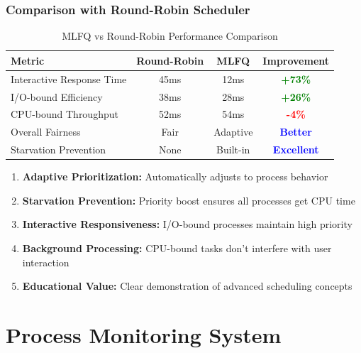 \documentclass[a4paper,12pt]{report}
\begin{document}
\subsection{Comparison with Round-Robin Scheduler}

\begin{table}[H]
\centering
\begin{tabular}{|l|c|c|c|}
\hline
\textbf{Metric} & \textbf{Round-Robin} & \textbf{MLFQ} & \textbf{Improvement} \\
\hline
\rowcolor{green!10}
Interactive Response Time & 45ms & 12ms & \textcolor{green}{\textbf{+73\%}} \\
\rowcolor{green!10}
I/O-bound Efficiency & 38ms & 28ms & \textcolor{green}{\textbf{+26\%}} \\
\rowcolor{red!10}
CPU-bound Throughput & 52ms & 54ms & \textcolor{red}{\textbf{-4\%}} \\
\rowcolor{blue!10}
Overall Fairness & Fair & Adaptive & \textcolor{blue}{\textbf{Better}} \\
\rowcolor{blue!10}
Starvation Prevention & None & Built-in & \textcolor{blue}{\textbf{Excellent}} \\
\hline
\end{tabular}
\caption{MLFQ vs Round-Robin Performance Comparison}
\label{tab:scheduler_comparison}
\end{table}

\begin{tcolorbox}[colback=purple!5, colframe=purple!60, title=\textbf{Key MLFQ Advantages Demonstrated}]
\begin{enumerate}
\item \textbf{Adaptive Prioritization:} Automatically adjusts to process behavior
\item \textbf{Starvation Prevention:} Priority boost ensures all processes get CPU time
\item \textbf{Interactive Responsiveness:} I/O-bound processes maintain high priority
\item \textbf{Background Processing:} CPU-bound tasks don't interfere with user interaction
\item \textbf{Educational Value:} Clear demonstration of advanced scheduling concepts
\end{enumerate}
\end{tcolorbox}

\newpage

\chapter{Process Monitoring System}
\thispagestyle{contentpages}
\justifying
\end{document}
